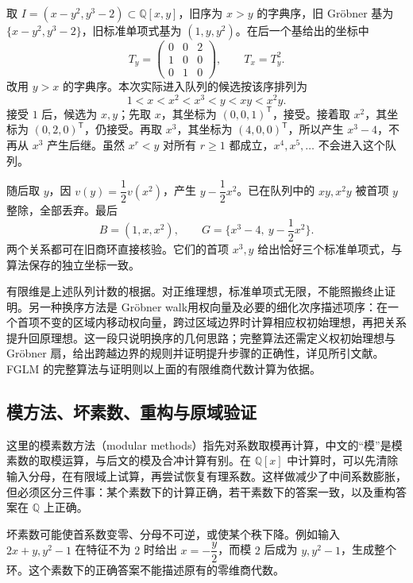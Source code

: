 \begin{example}\label{b3:exm:B-fglm-complete}
	取 \(I=(x-y^2,y^3-2)\subset\mathbb Q[x,y]\)，旧序为 \(x>y\) 的字典序，旧 Gröbner 基为 \(\{x-y^2,y^3-2\}\)，旧标准单项式基为 \((1,y,y^2)\)。在后一个基给出的坐标中
	\[
		T_y=\begin{pmatrix}0&0&2\\1&0&0\\0&1&0\end{pmatrix},
		\qquad T_x=T_y^2.
	\]
	改用 \(y>x\) 的字典序。本次实际进入队列的候选按该序排列为
	\[
		1<x<x^2<x^3<y<xy<x^2y.
	\]
	接受 \(1\) 后，候选为 \(x,y\)；先取 \(x\)，其坐标为 \((0,0,1)^{\mathsf T}\)，接受。接着取 \(x^2\)，其坐标为 \((0,2,0)^{\mathsf T}\)，仍接受。再取 \(x^3\)，其坐标为 \((4,0,0)^{\mathsf T}\)，所以产生 \(x^3-4\)，不再从 \(x^3\) 产生后继。虽然 \(x^r<y\) 对所有 \(r\ge1\) 都成立，\(x^4,x^5,\ldots\) 不会进入这个队列。

	\ProseParagraphBreak
	随后取 \(y\)，因 \(v(y)=\dfrac12v(x^2)\)，产生 \(y-\dfrac12x^2\)。已在队列中的 \(xy,x^2y\) 被首项 \(y\) 整除，全部丢弃。最后
	\[
		B=(1,x,x^2),\qquad G=\{x^3-4,\ y-\dfrac12x^2\}.
	\]
	两个关系都可在旧商环直接核验。它们的首项 \(x^3,y\) 给出恰好三个标准单项式，与算法保存的独立坐标一致。
\end{example}

有限维是上述队列计数的根据。对正维理想，标准单项式无限，不能照搬终止证明。另一种换序方法是 Gröbner walk\cite{CollartKalkbrenerMall1997GroebnerWalk}用权向量及必要的细化次序描述项序：在一个首项不变的区域内移动权向量，跨过区域边界时计算相应权初始理想，再把关系提升回原理想。这一段只说明换序的几何思路；完整算法还需定义权初始理想与 Gröbner 扇，给出跨越边界的规则并证明提升步骤的正确性，详见所引文献。FGLM 的完整算法与证明则以上面的有限维商代数计算为依据。

\subsection{模方法、坏素数、重构与原域验证}
\label{b3:subsec:B02:03}

这里的模素数方法（modular methods）指先对系数取模再计算，中文的“模”是模素数的取模运算，与后文的模及合冲计算有别。在 \(\mathbb Q[x]\) 中计算时，可以先清除输入分母，在有限域上试算，再尝试恢复有理系数。这样做减少了中间系数膨胀，但必须区分三件事：某个素数下的计算正确，若干素数下的答案一致，以及重构答案在 \(\mathbb Q\) 上正确。

\ProseParagraphBreak
坏素数可能使首系数变零、分母不可逆，或使某个秩下降。例如输入 \(2x+y,y^2-1\) 在特征不为 \(2\) 时给出 \(x=-\dfrac y2\)，而模 \(2\) 后成为 \(y,y^2-1\)，生成整个环。这个素数下的正确答案不能描述原有的零维商代数。

